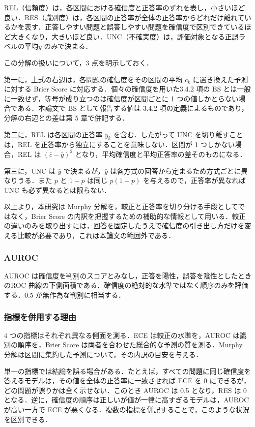 REL（信頼度）は，各区間における確信度と正答率のずれを表し，小さいほど良い．RES（識別度）は，各区間の正答率が全体の正答率からどれだけ離れているかを表す．正答しやすい問題と誤答しやすい問題を確信度で区別できているほど大きくなり，大きいほど良い．UNC（不確実度）は，評価対象となる正誤ラベルの平均$\bar{y}$ のみで決まる．

この分解の扱いについて，3 点を明示しておく．

第一に，上式の右辺は，各問題の確信度をその区間の平均 $\bar{c}_k$ に置き換えた予測に対する Brier Score に対応する．個々の確信度を用いた3.4.2 項の $\mathrm{BS}$ とは一般に一致せず，等号が成り立つのは確信度が区間ごとに 1 つの値しかとらない場合である．本論文で $\mathrm{BS}$ として報告する値は 3.4.2 項の定義によるものであり，分解の右辺との差は第 5 章で併記する．

第二に，REL は各区間の正答率 $\bar{y}_k$ を含む．したがって UNC を切り離すことは，REL を正答率から独立にすることを意味しない．区間が 1 つしかない場合，REL は $(\bar{c} - \bar{y})^2$ となり，平均確信度と平均正答率の差そのものになる．

第三に，UNC は $\bar{y}$ で決まるが，$\bar{y}$ は各方式の回答から定まるため方式ごとに異なりうる．また $p$ と $1-p$ は同じ $p(1-p)$ を与えるので，正答率が異なれば UNC も必ず異なるとは限らない．

以上より，本研究は Murphy 分解を，較正と正答率を切り分ける手段としてではなく，Brier Score の内訳を把握するための補助的な情報として用いる．較正の違いのみを取り出すには，回答を固定したうえで確信度の引き出し方だけを変える比較が必要であり，これは本論文の範囲外である．

\subsubsection{AUROC}

AUROC は確信度を判別のスコアとみなし，正答を陽性，誤答を陰性としたときのROC 曲線の下側面積である．確信度の絶対的な水準ではなく順序のみを評価する．0.5 が無作為な判別に相当する．

\subsubsection{指標を併用する理由}

4 つの指標はそれぞれ異なる側面を測る．ECE は較正の水準を，AUROC は識別の順序を，Brier Score は両者を合わせた総合的な予測の質を測る．Murphy 分解は区間に集約した予測について，その内訳の目安を与える．

単一の指標では結論を誤る場合がある．たとえば，すべての問題に同じ確信度を答えるモデルは，その値を全体の正答率に一致させれば ECE を 0 にできるが，どの問題が誤りかは全く示せない．このとき AUROC は 0.5 となり，RES は 0 となる．逆に，確信度の順序は正しいが値が一律に高すぎるモデルは，AUROC が高い一方で ECE が悪くなる．複数の指標を併記することで，このような状況を区別できる．

